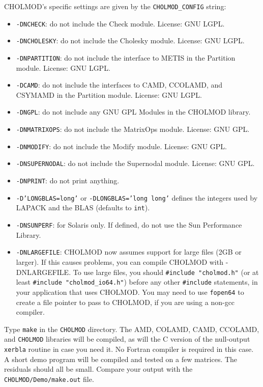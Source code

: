 \documentclass[11pt]{article}
\begin{document}
\noindent
CHOLMOD's specific settings are given by the {\tt CHOLMOD\_CONFIG} string:
\begin{itemize}
\item {\tt -DNCHECK}:	    do not include the Check module.	   License: GNU LGPL.
\item {\tt -DNCHOLESKY}:    do not include the Cholesky module.	   License: GNU LGPL.
\item {\tt -DNPARTITION}:   do not include the interface to METIS in
the Partition module.   License: GNU LGPL.
\item {\tt -DCAMD}:   do not include the interfaces to CAMD, CCOLAMD,
and CSYMAMD in the Partition module.   License: GNU LGPL.
\item {\tt -DNGPL}:	    do not include any GNU GPL Modules in the CHOLMOD library.
\item {\tt -DNMATRIXOPS}:   do not include the MatrixOps module.   License: GNU GPL.
\item {\tt -DNMODIFY}:	    do not include the Modify module.      License: GNU GPL.
\item {\tt -DNSUPERNODAL}:  do not include the Supernodal module.  License: GNU GPL.
\item {\tt -DNPRINT}:	    do not print anything.
\item {\tt -D'LONGBLAS=long'} or {\tt -DLONGBLAS='long long'}
			    defines the integers used by LAPACK and the BLAS (defaults to {\tt int}).
\item {\tt -DNSUNPERF}:	    for Solaris only.  If defined, do not use the Sun Performance Library.
\item {\tt -DNLARGEFILE}:   CHOLMOD now assumes support for large files (2GB or
larger).  If this causes problems, you can compile CHOLMOD with -DNLARGEFILE.
To use large files, you should {\tt \#include "cholmod.h"} (or at least
{\tt \#include "cholmod\_io64.h"}) before any other {\tt \#include} statements,
in your application that uses CHOLMOD.  You may need to use {\tt fopen64}
to create a file pointer to pass to CHOLMOD, if you are using a non-gcc
compiler.
\end{itemize}

Type {\tt make} in the {\tt CHOLMOD} directory.  The AMD,
COLAMD, CAMD, CCOLAMD, and {\tt CHOLMOD} libraries will be compiled,
as will the C version of the null-output {\tt xerbla} routine in case you need it.
No Fortran compiler is required in this case.  A short demo program will
be compiled and tested on a few matrices.  The residuals should all be small.
Compare your output with the {\tt CHOLMOD/Demo/make.out} file.
\end{document}

